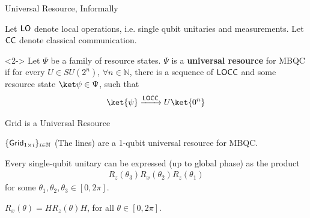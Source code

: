 \begin{frame}{Universal Resource, Informally}

\begin{definition}
Let $\textsf{LO}$ denote local operations, i.e. single qubit unitaries and measurements. Let $\textsf{CC}$ denote classical communication.
\end{definition}

\begin{definition}<2->
Let $\Psi$ be a family of resource states. $\Psi$ is a \textbf{universal resource} for MBQC if for every $U \in SU(2^n)$, $\forall n \in \mathbb{N}$, there is a sequence of $\textsf{LOCC}$ and some resource state $\ket\psi \in \Psi$, such that 
\begin{align}
    \ket{\psi} \xrightarrow{\LOCC} U \ket{0^n}
\end{align}
\end{definition}

\end{frame}

\begin{frame}{Grid is a Universal Resource}

\begin{theorem}
$\{\textsf{Grid}_{1 \times i}\}_{i\in \mathbb{N}}$ (The lines) are a 1-qubit universal resource for MBQC.
\end{theorem}

\begin{lemma}
Every single-qubit unitary can be expressed (up to global phase) as the product
\begin{align}
    R_z(\theta_3)R_x(\theta_2)R_z(\theta_1)
\end{align}
for some $\theta_1, \theta_2, \theta_3 \in [0,2\pi]$.
\end{lemma}

\begin{lemma}
$R_x(\theta) = H R_z(\theta) H$, for all $\theta \in [0,2\pi]$.
\end{lemma}

\end{frame}

